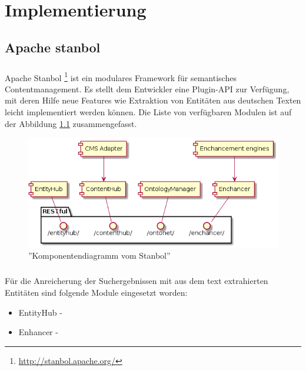 \chapter{Implementierung}
\label{sec:Implementierung}

\section{Apache stanbol}

\paragraph{}
Apache Stanbol \footnote{\url{http://stanbol.apache.org/}} ist ein modulares Framework für semantisches Contentmanagement. Es stellt dem Entwickler eine Plugin-API zur Verfügung, mit deren Hilfe neue Features wie Extraktion von Entitäten aus deutschen Texten leicht implementiert werden können. Die Liste von verfügbaren Modulen ist auf der Abbildung \ref{fig:komponenten} zusammengefasst.

\begin{figure}
\centering
\includegraphics[scale=0.5]{Bilder/komponenten.png}
\caption{''Komponentendiagramm vom Stanbol''}
\label{fig:komponenten}
\end{figure}

\paragraph{}
Für die Anreicherung der Suchergebnissen mit aus dem text extrahierten Entitäten sind folgende Module eingesetzt worden:
\begin{itemize}
\item EntityHub - 
\item Enhancer - 
\end{itemize}


